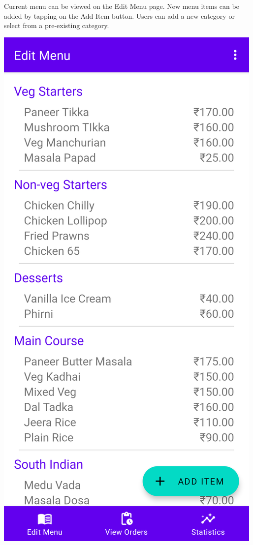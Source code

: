\documentclass{article}
\begin{document}
\newpage
Current menu can be viewed on the Edit Menu page. New menu items can be added by tapping on the Add Item button. Users can add a new category or select from a pre-existing category.
\begin{center}
\includegraphics[scale=0.15]{view-menu}

\end{center}
\end{document}

